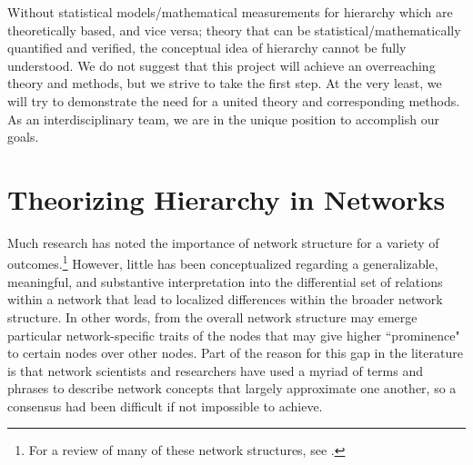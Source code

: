 \documentclass[3p,times]{elsarticle}
\begin{document}
Without statistical models/mathematical measurements for hierarchy which are theoretically based, and vice versa; theory that can be statistical/mathematically quantified and verified, the conceptual idea of hierarchy cannot be fully understood. We do not suggest that this project will achieve an overreaching theory and methods, but we strive to take the first step. At the very least, we will try to demonstrate the need for a united theory and corresponding methods. As an interdisciplinary team, we are in the unique position to accomplish our goals.

\section{Theorizing Hierarchy in Networks}
Much research has noted the importance of network structure for a variety of outcomes.\footnote{For a review of many of these network structures, see \cite{smith2005networks}.} However, little has been conceptualized regarding a generalizable, meaningful, and substantive interpretation into the differential set of relations within a network that lead to localized differences within the broader network structure. In other words, from the overall network structure may emerge particular network-specific traits of the nodes that may give higher ``prominence" to certain nodes over other nodes. Part of the reason for this gap in the literature is that network scientists and researchers have used a myriad of terms and phrases to describe network concepts that largely approximate one another, so a consensus had been difficult if not impossible to achieve.
\end{document}
